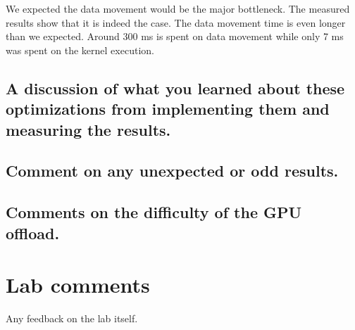 \documentclass{article}
\begin{document}
We expected the data movement would be the major bottleneck. The
measured results show that it is indeed the case. The data movement
time is even longer than we expected. Around 300 ms is spent on
data movement while only 7 ms was spent on the kernel execution.

\subsection{A discussion of what you learned about these optimizations from implementing them and measuring the results.}

\subsection{Comment on any unexpected or odd results.}

\subsection{Comments on the difficulty of the GPU offload.}

\section{Lab comments}
Any feedback on the lab itself.
\end{document}
